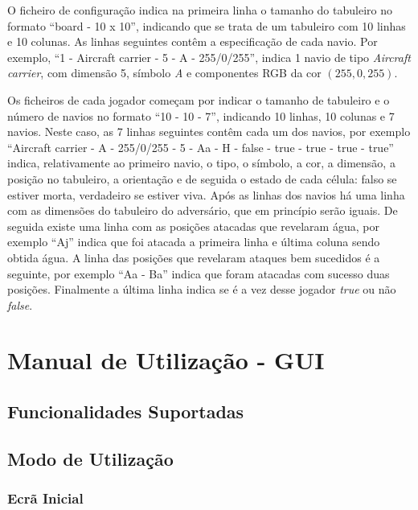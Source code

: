 \documentclass[12pt,a4paper,reqno]{report}
\numberwithin{equation}{section}
\begin{document}
	O ficheiro de configuração indica na primeira linha o tamanho do tabuleiro no formato ``board - 10 x 10'', indicando que se trata de um tabuleiro com 10 linhas e 10 colunas. As linhas seguintes contêm a especificação de cada navio. Por exemplo, ``1 - Aircraft carrier - 5 - A - 255/0/255'', indica 1 navio de tipo \emph{Aircraft carrier}, com dimensão 5, símbolo \emph{A} e componentes RGB da cor $(255, 0, 255)$.
	
	Os ficheiros de cada jogador começam por indicar o tamanho de tabuleiro e o número de navios no formato ``10 - 10 - 7'', indicando 10 linhas, 10 colunas e 7 navios. Neste caso, as 7 linhas seguintes contêm cada um dos navios, por exemplo ``Aircraft carrier - A - 255/0/255 - 5 - Aa - H - false - true - true - true - true'' indica, relativamente ao primeiro navio, o tipo, o símbolo, a cor, a dimensão, a posição no tabuleiro, a orientação e de seguida o estado de cada célula: falso se estiver morta, verdadeiro se estiver viva. Após as linhas dos navios há uma linha com as dimensões do tabuleiro do adversário, que em princípio serão iguais. De seguida existe uma linha com as posições atacadas que revelaram água, por exemplo ``Aj'' indica que foi atacada a primeira linha e última coluna sendo obtida água. A linha das posições que revelaram ataques bem sucedidos é a seguinte, por exemplo ``Aa - Ba'' indica que foram atacadas com sucesso duas posições. Finalmente a última linha indica se é a vez desse jogador \emph{true} ou não \emph{false}. 

\chapter{Manual de Utilização - GUI}

\section{Funcionalidades Suportadas}

\section{Modo de Utilização}

\subsection{Ecrã Inicial}
\end{document}
